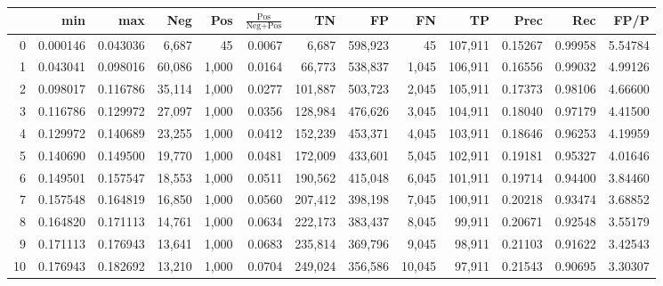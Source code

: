 \begin{tabular}{rrrrrrrrrrrrr}
\toprule
{} &       min &       max &     Neg &    Pos & $\frac{\text{Pos}}{\text{Neg}+\text{Pos}}$ &       TN &       FP &       FN &       TP &     Prec &      Rec &     FP/P \\
\midrule
0   &  0.000146 &  0.043036 &   6,687 &     45 &                                     0.0067 &    6,687 &  598,923 &       45 &  107,911 &  0.15267 &  0.99958 &  5.54784 \\
1   &  0.043041 &  0.098016 &  60,086 &  1,000 &                                     0.0164 &   66,773 &  538,837 &    1,045 &  106,911 &  0.16556 &  0.99032 &  4.99126 \\
2   &  0.098017 &  0.116786 &  35,114 &  1,000 &                                     0.0277 &  101,887 &  503,723 &    2,045 &  105,911 &  0.17373 &  0.98106 &  4.66600 \\
3   &  0.116786 &  0.129972 &  27,097 &  1,000 &                                     0.0356 &  128,984 &  476,626 &    3,045 &  104,911 &  0.18040 &  0.97179 &  4.41500 \\
4   &  0.129972 &  0.140689 &  23,255 &  1,000 &                                     0.0412 &  152,239 &  453,371 &    4,045 &  103,911 &  0.18646 &  0.96253 &  4.19959 \\
5   &  0.140690 &  0.149500 &  19,770 &  1,000 &                                     0.0481 &  172,009 &  433,601 &    5,045 &  102,911 &  0.19181 &  0.95327 &  4.01646 \\
6   &  0.149501 &  0.157547 &  18,553 &  1,000 &                                     0.0511 &  190,562 &  415,048 &    6,045 &  101,911 &  0.19714 &  0.94400 &  3.84460 \\
7   &  0.157548 &  0.164819 &  16,850 &  1,000 &                                     0.0560 &  207,412 &  398,198 &    7,045 &  100,911 &  0.20218 &  0.93474 &  3.68852 \\
8   &  0.164820 &  0.171113 &  14,761 &  1,000 &                                     0.0634 &  222,173 &  383,437 &    8,045 &   99,911 &  0.20671 &  0.92548 &  3.55179 \\
9   &  0.171113 &  0.176943 &  13,641 &  1,000 &                                     0.0683 &  235,814 &  369,796 &    9,045 &   98,911 &  0.21103 &  0.91622 &  3.42543 \\
10  &  0.176943 &  0.182692 &  13,210 &  1,000 &                                     0.0704 &  249,024 &  356,586 &   10,045 &   97,911 &  0.21543 &  0.90695 &  3.30307 \\

\end{tabular}
